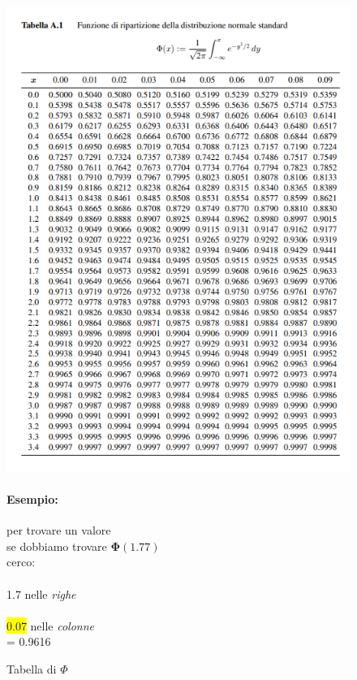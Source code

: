 \documentclass[]{article}
\begin{document}
    \begin{figure}[H]
        \caption{Tabella di $\Phi$}
        \begin{minipage}{0.59\textwidth}
            \includegraphics[width=\textwidth]{images/phi_table.png}
        \end{minipage}
        \begin{minipage}{0.4\textwidth}
            \paragraph{Esempio:} per trovare un valore \\
            se dobbiamo trovare $\boldsymbol{\Phi(1.77)}$ \\
            cerco: \\ \\
            \colorbox{bittersweet}{1.7} nelle \textit{righe} \\ \\
            \colorbox{yellow}{0.07} nelle \textit{colonne} \\
            = 0.9616
        \end{minipage}
    \end{figure}
\end{document}
